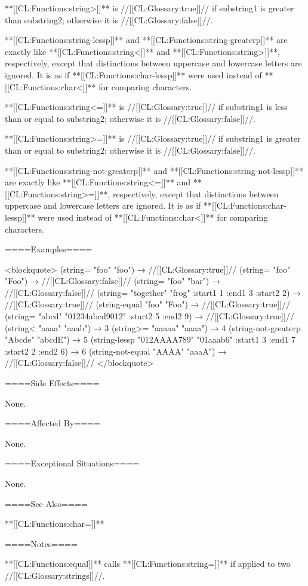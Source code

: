 **[[CL:Functions:string>]]** is //[[CL:Glossary:true]]// if substring1 is greater than substring2; otherwise it is //[[CL:Glossary:false]]//.


**[[CL:Functions:string-lessp]]** and **[[CL:Functions:string-greaterp]]** are exactly like **[[CL:Functions:string<]]** and **[[CL:Functions:string>]]**, respectively, except that distinctions between uppercase and lowercase letters are ignored. It is as if **[[CL:Functions:char-lessp]]** were used instead of **[[CL:Functions:char<]]** for comparing characters.

\itemitem{**[[CL:Functions:string<=]]**}

**[[CL:Functions:string<=]]** is //[[CL:Glossary:true]]// if substring1 is less than or equal to substring2; otherwise it is //[[CL:Glossary:false]]//.

\itemitem{**[[CL:Functions:string>=]]**}

**[[CL:Functions:string>=]]** is //[[CL:Glossary:true]]// if substring1 is greater than or equal to substring2; otherwise it is //[[CL:Glossary:false]]//.


**[[CL:Functions:string-not-greaterp]]** and **[[CL:Functions:string-not-lessp]]** are exactly like **[[CL:Functions:string<=]]** and **[[CL:Functions:string>=]]**, respectively, except that distinctions between uppercase and lowercase letters are ignored. It is as if **[[CL:Functions:char-lessp]]** were used instead of **[[CL:Functions:char<]]** for comparing characters.

\endlist


====Examples====

<blockquote> (string= "foo" "foo") → //[[CL:Glossary:true]]// (string= "foo" "Foo") → //[[CL:Glossary:false]]// (string= "foo" "bar") → //[[CL:Glossary:false]]// (string= "together" "frog" :start1 1 :end1 3 :start2 2) → //[[CL:Glossary:true]]// (string-equal "foo" "Foo") → //[[CL:Glossary:true]]// (string= "abcd" "01234abcd9012" :start2 5 :end2 9) → //[[CL:Glossary:true]]// (string< "aaaa" "aaab") → 3 (string>= "aaaaa" "aaaa") → 4 (string-not-greaterp "Abcde" "abcdE") → 5 (string-lessp "012AAAA789" "01aaab6" :start1 3 :end1 7 :start2 2 :end2 6) → 6 (string-not-equal "AAAA" "aaaA") → //[[CL:Glossary:false]]// </blockquote>

====Side Effects====

None.

====Affected By====

None.

====Exceptional Situations====

None.

====See Also====

**[[CL:Functions:char=]]**

====Notes====

**[[CL:Functions:equal]]** calls **[[CL:Functions:string=]]** if applied to two //[[CL:Glossary:strings]]//.

  

